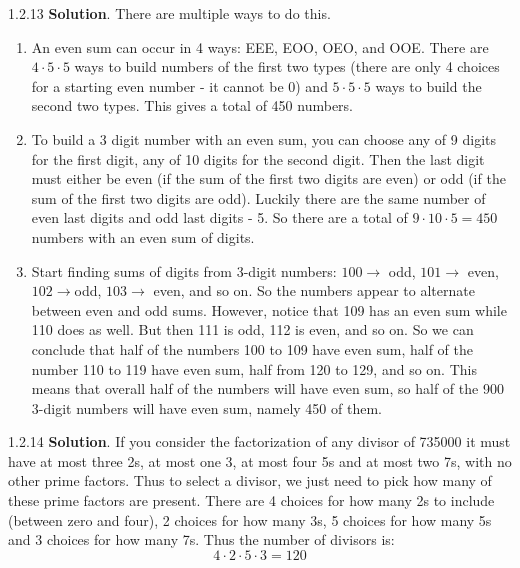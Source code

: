 \documentclass[11pt,]{book}
\theoremstyle{ptxplainnotitle}
\theoremstyle{ptxplaintitle}
\theoremstyle{ptxdefinitionnotitle}
\theoremstyle{ptxdefinitiontitle}
\theoremstyle{ptxdefinitionnotitle}
\theoremstyle{ptxdefinitiontitle}
\theoremstyle{ptxdefinitionnotitle}
\theoremstyle{ptxdefinitiontitle}
\theoremstyle{ptxdefinitiontitlenonumber}
\theoremstyle{ptxdefinitiontitlenonumber}
\numberwithin{equation}{chapter}
\begin{document}
\begin{divisionexercise}{1.2.13}
\textbf{Solution}.\quad%
\hypertarget{p-1251}{}%
There are multiple ways to do this. \leavevmode%
\begin{enumerate}[label=(\alph*)]
\item\hypertarget{li-537}{}\hypertarget{p-1252}{}%
An even sum can occur in 4 ways: EEE, EOO, OEO, and OOE. There are \(4 \cdot 5 \cdot 5\) ways to build numbers of the first two types (there are only 4 choices for a starting even number - it cannot be 0) and \(5 \cdot 5 \cdot 5\) ways to build the second two types. This gives a total of 450 numbers.%
\item\hypertarget{li-538}{}\hypertarget{p-1253}{}%
To build a 3 digit number with an even sum, you can choose any of 9 digits for the first digit, any of 10 digits for the second digit. Then the last digit must either be even (if the sum of the first two digits are even) or odd (if the sum of the first two digits are odd). Luckily there are the same number of even last digits and odd last digits - 5. So there are a total of \(9 \cdot 10 \cdot 5 = 450\) numbers with an even sum of digits.%
\item\hypertarget{li-539}{}\hypertarget{p-1254}{}%
Start finding sums of digits from 3-digit numbers: \(100 \to\) odd, \(101 \to\) even, \(102 \to\)odd, \(103 \to\) even, and so on. So the numbers appear to alternate between even and odd sums. However, notice that 109 has an even sum while 110 does as well. But then 111 is odd, 112 is even, and so on. So we can conclude that half of the numbers 100 to 109 have even sum, half of the number 110 to 119 have even sum, half from 120 to 129, and so on. This means that overall half of the numbers will have even sum, so half of the 900 3-digit numbers will have even sum, namely 450 of them.%
\end{enumerate}
%
\end{divisionexercise}%
\begin{divisionexercise}{1.2.14}
\textbf{Solution}.\quad%
\hypertarget{p-1256}{}%
If you consider the factorization of any divisor of 735000 it must have at most three 2s, at most one 3, at most four 5s and at most two 7s, with no other prime factors. Thus to select a divisor, we just need to pick how many of these prime factors are present. There are 4 choices for how many 2s to include (between zero and four), 2 choices for how many 3s, 5 choices for how many 5s and 3 choices for how many 7s. Thus the number of divisors is:%
\begin{equation*}
4\cdot 2 \cdot 5 \cdot 3 = 120
\end{equation*}
%
\end{divisionexercise}%
\end{document}
